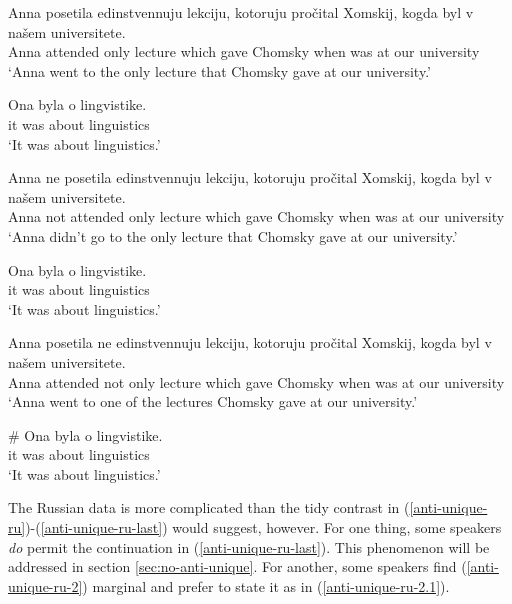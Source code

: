 \begin{exe}
	\ex \label{anti-unique-ru} \begin{xlist}
		\ex \gll Anna posetila edinstvennuju lekciju, kotoruju pro\v{c}ital Xomskij, kogda byl v na\v{s}em universitete.\\
		Anna attended only lecture which gave Chomsky when was at our university\\
		\glt `Anna went to the only lecture that Chomsky gave at our university.'
		
		\ex \gll Ona byla o lingvistike.\\
		it was about linguistics\\
		\glt `It was about linguistics.'
	\end{xlist}
	
	\ex \label{anti-unique-ru-2} \begin{xlist}
		\ex \gll Anna ne posetila edinstvennuju lekciju, kotoruju pro\v{c}ital Xomskij, kogda byl v na\v{s}em universitete.\\
		Anna not attended only lecture which gave Chomsky when was at our university\\
		\glt `Anna didn't go to the only lecture that Chomsky gave at our university.'
		
		\ex \gll Ona byla o lingvistike.\\
		it was about linguistics\\
		\glt `It was about linguistics.'
	\end{xlist}
	
	\ex \label{anti-unique-ru-last} \begin{xlist} 
		\ex \gll Anna posetila ne edinstvennuju lekciju, kotoruju pro\v{c}ital Xomskij, kogda byl v na\v{s}em universitete.\\
		Anna attended not only lecture which gave Chomsky when was at our university\\
		\glt `Anna went to one of the lectures Chomsky gave at our university.'
		
		\ex \gll \# Ona byla o lingvistike.\\
		{} it was about linguistics\\
		\glt `It was about linguistics.'
	\end{xlist}
\end{exe}

The Russian data is more complicated than the tidy contrast in (\ref{anti-unique-ru})-(\ref{anti-unique-ru-last}) would suggest, however. For one thing, some speakers \textit{do} permit the continuation in (\ref{anti-unique-ru-last}). This phenomenon will be addressed in section \ref{sec:no-anti-unique}. For another, some speakers find (\ref{anti-unique-ru-2}) marginal and prefer to state it as in (\ref{anti-unique-ru-2.1}).

